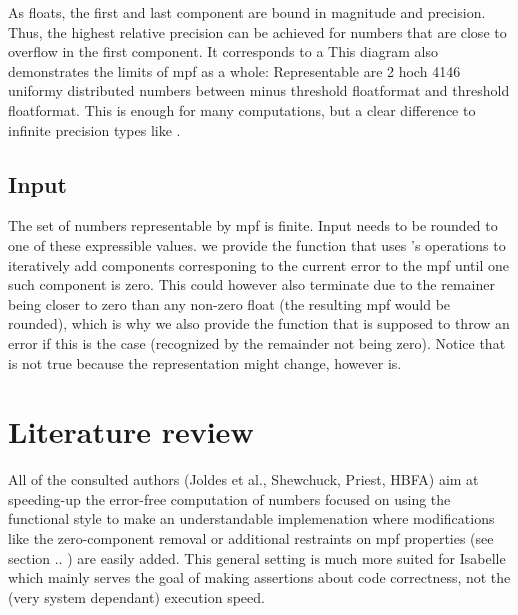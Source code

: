 \documentclass[11pt,a4paper]{article}
\begin{document}
As floats, the first and last component are bound in magnitude and precision. Thus, the highest relative precision can be achieved for numbers that are close to overflow in the first component. It corresponds to a 
This diagram also demonstrates the limits of mpf as a whole: Representable are 2 hoch 4146 uniformy distributed numbers between minus threshold floatformat and threshold floatformat. This is enough for many computations, but a clear difference to infinite precision types like
.


\subsection{Input}
The set of numbers representable by mpf is finite.
Input needs to be rounded to one of these expressible values. we provide the
function that uses
's operations to iteratively add components corresponing to the current error to the mpf until one such component is zero. This could however also terminate due to the remainer being closer to zero than any non-zero float (the resulting mpf would be rounded), which is why we also provide the
function that is supposed to throw an error if this is the case (recognized by the remainder not being zero).
Notice that
is not true because the representation might change,
however
is.



\section{Literature review}

All of the consulted authors (Joldes et al., Shewchuck, Priest, HBFA) aim at speeding-up the error-free computation of numbers
focused on using the functional style to make an understandable implemenation where modifications like the zero-component removal or additional restraints on mpf properties (see section .. ) are easily added.
This general setting is much more suited for Isabelle which mainly serves the goal of making assertions about code correctness, not the (very system dependant) execution speed.
\end{document}
